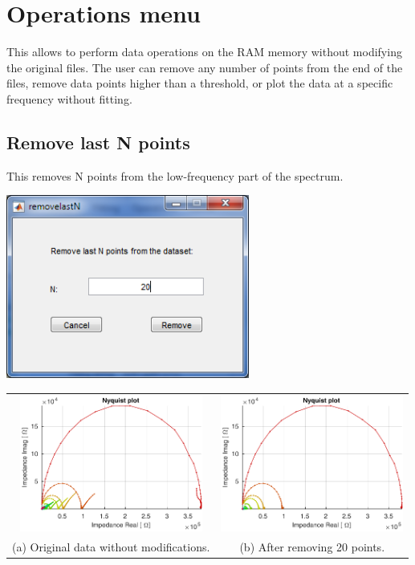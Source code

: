 \documentclass[10pt,b5paper,oneside]{book}
\begin{document}
%


\chapter{Operations menu}

This allows to perform data operations on the RAM memory without modifying the original files. The user can remove any number of points from the end of the files, remove data points higher than a threshold, or plot the data at a specific frequency without fitting.


\section{Remove last N points}

This removes N points from the low-frequency part of the spectrum.

\includegraphics[width=8cm]{remove2.png}

\begin{tabular}{cc}
\includegraphics[width=6cm]{remove1.pdf} & \includegraphics[width=6cm]{remove3.pdf} \\
(a) Original data without modifications. & (b) After removing 20 points. \\
\end{tabular}
\end{document}
